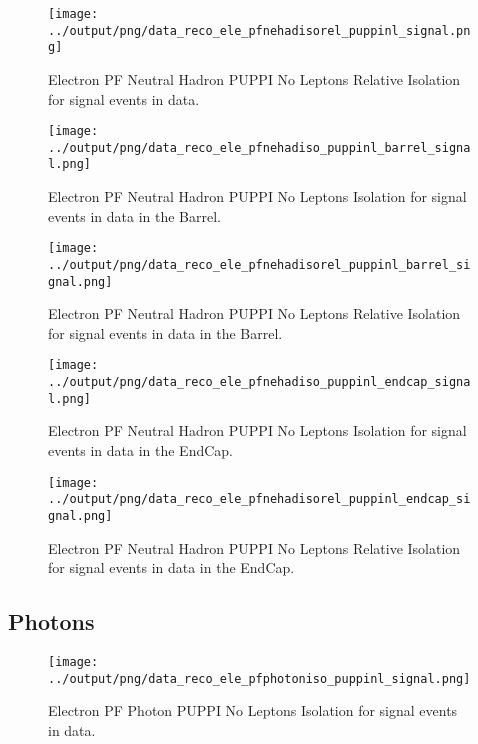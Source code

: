 \documentclass[11pt]{book}
\begin{document}
\begin{figure}[htb]
\centering
\texttt{[image: ../output/png/data\_reco\_ele\_pfnehadisorel\_puppinl\_signal.png]}
\caption{Electron PF Neutral Hadron PUPPI No Leptons Relative Isolation for signal events in data.}
\label{fig:data_ele_pfnehadisorel_puppinl_signal}
\end{figure}

\begin{figure}[htb]
\centering
\texttt{[image: ../output/png/data\_reco\_ele\_pfnehadiso\_puppinl\_barrel\_signal.png]}
\caption{Electron PF Neutral Hadron PUPPI No Leptons Isolation for signal events in data in the Barrel.}
\label{fig:data_ele_pfnehadiso_puppinl_barrel_signal}
\end{figure}

\begin{figure}[htb]
\centering
\texttt{[image: ../output/png/data\_reco\_ele\_pfnehadisorel\_puppinl\_barrel\_signal.png]}
\caption{Electron PF Neutral Hadron PUPPI No Leptons Relative Isolation for signal events in data in the Barrel.}
\label{fig:data_ele_pfnehadisorel_puppinl_barrel_signal}
\end{figure}

\begin{figure}[htb]
\centering
\texttt{[image: ../output/png/data\_reco\_ele\_pfnehadiso\_puppinl\_endcap\_signal.png]}
\caption{Electron PF Neutral Hadron PUPPI No Leptons Isolation for signal events in data in the EndCap.}
\label{fig:data_ele_pfnehadiso_puppinl_endcap_signal}
\end{figure}

\begin{figure}[htb]
\centering
\texttt{[image: ../output/png/data\_reco\_ele\_pfnehadisorel\_puppinl\_endcap\_signal.png]}
\caption{Electron PF Neutral Hadron PUPPI No Leptons Relative Isolation for signal events in data in the EndCap.}
\label{fig:data_ele_pfnehadisorel_puppinl_endcap_signal}
\end{figure}
\clearpage

\subsection{Photons}
\begin{figure}[htb]
\centering
\texttt{[image: ../output/png/data\_reco\_ele\_pfphotoniso\_puppinl\_signal.png]}
\caption{Electron PF Photon PUPPI No Leptons Isolation for signal events in data.}
\label{fig:data_ele_pfphotoniso_puppinl_signal}
\end{figure}
\end{document}
